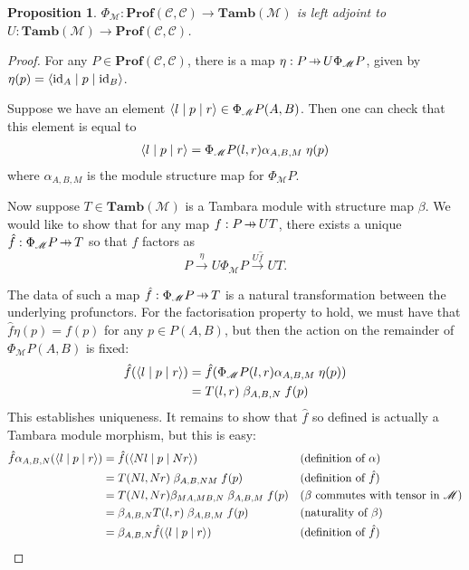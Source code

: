 \documentclass[11pt,letterpaper]{article}
\theoremstyle{plain}
\newtheorem{proposition}[theorem]{Proposition}
\theoremstyle{definition}
\newcommand{\C}{\mathscr{C}}
\newcommand{\M}{\mathscr{M}}
\newcommand{\Pastro}{\Phi}
\newcommand{\Prof}{\mathbf{Prof}}
\newcommand{\Tamb}{\mathbf{Tamb}}
\newcommand{\id}{\mathrm{id}}
\newcommand{\repthree}[3]{{\ensuremath \langle #1 \mid #2 \mid #3 \rangle}}
\newcommand{\hto}{\ensuremath{\,\mathaccent\shortmid\rightarrow\,}}
\begin{document}
\begin{proposition}
  $\Pastro_\M : \Prof(\C, \C) \to \Tamb(\M)$ is left adjoint to $U : \Tamb(\M) \to \Prof(\C, \C)$.
\end{proposition}
\begin{proof}
  For any $P \in \Prof(\C, \C)$, there is a map $\eta : P \hto U \Phi_\M P$, given by $\eta(p) = \repthree{\id_A}{p}{\id_B}$.

  Suppose we have an element $\repthree{l}{p}{r} \in \Pastro_\M P(A,B)$. Then one can check that this element is equal to
  \begin{align*}
    \repthree{l}{p}{r} = \Pastro_\M P(l, r) \alpha_{A, B, M} \; \eta(p)
  \end{align*}
  where $\alpha_{A, B, M}$ is the module structure map for $\Pastro_\M P$.

  Now suppose $T \in \Tamb(\M)$ is a Tambara module with structure map $\beta$. We would like to show that for any map $f : P \hto UT$, there exists a unique $\hat f : \Phi_\M P \hto T$ so that $f$ factors as \[P \xrightarrow{\eta} U \Phi_\M P \xrightarrow{U\hat f} UT. \]

  The data of such a map $\hat f : \Phi_\M P \hto T$ is a natural transformation between the underlying profunctors. For the factorisation property to hold, we must have that $\hat{f}\eta(p) = f(p)$ for any $p \in P(A,B)$, but then the action on the remainder of $\Phi_\M P(A, B)$ is fixed:
  \begin{align*}
    \hat{f}(\repthree{l}{p}{r}) &= \hat{f}(\Pastro_\M P(l, r) \alpha_{A, B, M} \; \eta(p)) \\
                                     &=T(l, r) \; \beta_{A, B, N} \; f(p)
  \end{align*}
  This establishes uniqueness. It remains to show that $\hat{f}$ so defined is actually a Tambara module morphism, but this is easy:
  \begin{align*}
    \hat{f}\alpha_{A,B,N}(\repthree{l}{p}{r})
    &= \hat{f}(\repthree{Nl}{p}{Nr}) && \text{(definition of $\alpha$)}\\
    &= T(Nl, Nr) \; \beta_{A, B, NM} \; f(p) && \text{(definition of $\hat{f}$)}\\
    &= T(Nl, Nr) \beta_{MA,MB,N} \; \beta_{A, B, M} \; f(p) && \text{($\beta$ commutes with tensor in $\M$)} \\
    &= \beta_{A,B,N} T(l, r) \; \beta_{A, B, M} \; f(p) && \text{(naturality of $\beta$)} \\
    &= \beta_{A,B,N} \hat{f} (\repthree{l}{p}{r}) && \text{(definition of $\hat{f}$)}
  \end{align*}
\end{proof}
\end{document}
